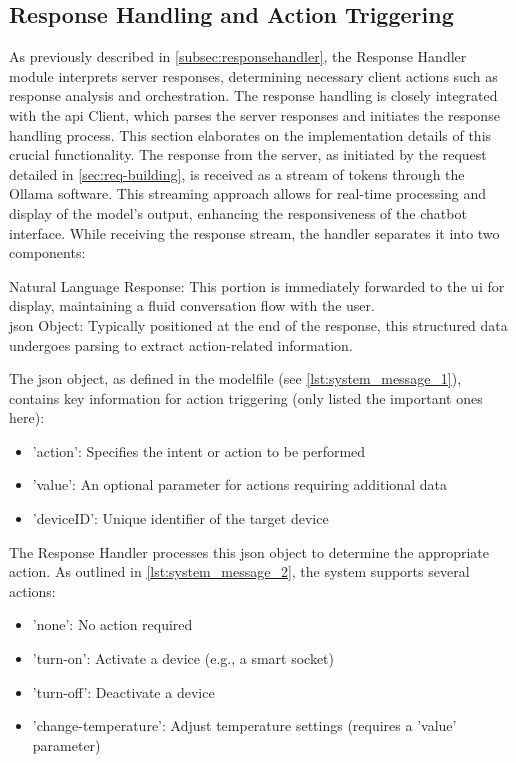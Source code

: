 \subsection{Response Handling and Action Triggering}
As previously described in \cref{subsec:responsehandler}, the Response Handler module interprets server responses, determining necessary client actions such as response analysis and orchestration. The response handling is closely integrated with the \gls{api} Client, which parses the server responses and initiates the response handling process. This section elaborates on the implementation details of this crucial functionality.
The response from the server, as initiated by the request detailed in \cref{sec:req-building}, is received as a stream of tokens through the Ollama software. This streaming approach allows for real-time processing and display of the model's output, enhancing the responsiveness of the chatbot interface.
While receiving the response stream, the handler separates it into two components:

Natural Language Response: This portion is immediately forwarded to the \gls{ui} for display, maintaining a fluid conversation flow with the user.\\
\gls{json} Object: Typically positioned at the end of the response, this structured data undergoes parsing to extract action-related information.

The \gls{json} object, as defined in the modelfile (see \cref{lst:system_message_1}), contains key information for action triggering (only listed the important ones here):

\begin{itemize}
\item 'action': Specifies the intent or action to be performed
\item 'value': An optional parameter for actions requiring additional data
\item 'deviceID': Unique identifier of the target device
\end{itemize}

The Response Handler processes this \gls{json} object to determine the appropriate action. As outlined in \cref{lst:system_message_2}, the system supports several actions:

\begin{itemize}
\item 'none': No action required
\item 'turn-on': Activate a device (e.g., a smart socket)
\item 'turn-off': Deactivate a device
\item 'change-temperature': Adjust temperature settings (requires a 'value' parameter)
\end{itemize}

